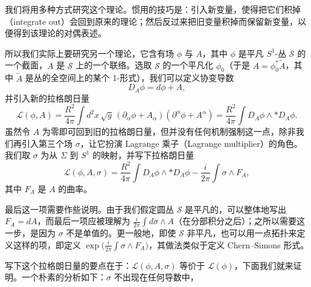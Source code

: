 
我们将用多种方式研究这个理论。惯用的技巧是：引入新变量，使得把它们积掉（integrate out）会回到原来的理论；然后反过来把旧变量积掉而保留新变量，以便得到该理论的对偶表述。

所以我们实际上要研究另一个理论，它含有场 $\phi$ 与 $A$，其中 $\phi$ 是平凡 $S^1$-丛 $\mathcal{S}$ 的一个截面，$A$ 是 $\mathcal{S}$ 上的一个联络。选取 $\mathcal{S}$ 的一个平凡化 $\phi_0$（于是 $A=\phi_0^\ast\tilde A$，其中 $\tilde A$ 是丛的全空间上的某个 1-形式），我们可以定义协变导数
\begin{equation}
  \tag{8.7}
  \label{eq:8-7}
  D_A\phi=d\phi+A,
\end{equation}
并引入新的拉格朗日量
\begin{equation}
  \tag{8.8}
  \label{eq:8-8}
  \mathcal{L}(\phi,A)=\frac{R^2}{4\pi}\int d^2x\,\sqrt{g}\,(\partial_\alpha\phi+A_\alpha)(\partial^\alpha\phi+A^\alpha)
  =\frac{R^2}{4\pi}\int D_A\phi\wedge\ast D_A\phi .
\end{equation}
虽然令 $A$ 为零即可回到旧的拉格朗日量，但并没有任何机制强制这一点，除非我们再引入第三个场 $\sigma$，让它扮演 Lagrange 乘子（Lagrange multiplier）的角色。我们取 $\sigma$ 为从 $\Sigma$ 到 $S^1$ 的映射，并写下拉格朗日量
\begin{equation}
  \tag{8.9}
  \label{eq:8-9}
  \mathcal{L}(\phi,A,\sigma)=\frac{R^2}{4\pi}\int D_A\phi\wedge\ast D_A\phi-\frac{i}{2\pi}\int\sigma\wedge F_A,
\end{equation}
其中 $F_A$ 是 $A$ 的曲率。

最后这一项需要作些说明。由于我们假定圆丛 $\mathcal{S}$ 是平凡的，可以整体地写出 $F_A=dA$，而最后一项应被理解为 $\frac{i}{2\pi}\int d\sigma\wedge A$（在分部积分之后）；之所以需要这一步，是因为 $\sigma$ 不是单值的。更一般地，即使 $\mathcal{S}$ 非平凡，也可以用一点拓扑来定义这样的项，即定义 $\exp\bigl(\frac{i}{2\pi}\int\sigma\wedge F_A\bigr)$，其做法类似于定义 Chern–Simons 形式。

写下这个拉格朗日量的要点在于：$\mathcal{L}(\phi,A,\sigma)$ 等价于 $\mathcal{L}(\phi)$，下面我们就来证明。一个朴素的分析如下：$\sigma$ 不出现在任何导数中，

